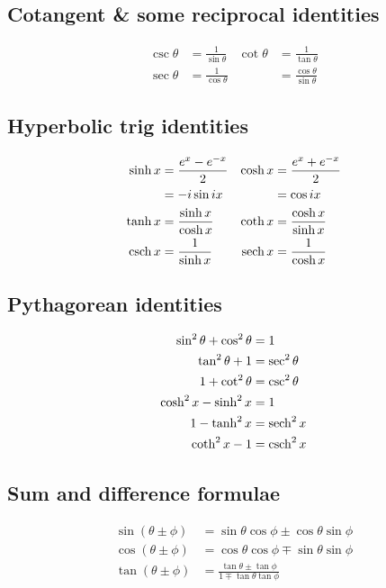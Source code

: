 \documentclass[main.tex]{subfiles}
\begin{document}
	\begin{multicols}{2} \raggedcolumns \setcounter{unbalance}{10}
		\subsection*{Cotangent \& some reciprocal identities}
		\begin{align*}
			\csc\theta &= \frac{1}{\sin\theta} & \cot\theta &= \frac{1}{\tan\theta} \\
			\sec\theta &= \frac{1}{\cos\theta} & &= \frac{\cos\theta}{\sin\theta}
		\end{align*}

		\subsection*{Hyperbolic trig identities}
		\begin{align*}
			\sinh{x} &= \frac{e^x - e^{-x}}{2}		&	\cosh{x} &= \frac{e^x + e^{-x}}{2} \\
			         &= -i \sin{ix}					&	         &= \cos{ix} \\
			\tanh{x} &= \frac{\sinh{x}}{\cosh{x}} 	&	\coth{x} &= \frac{\cosh{x}}{\sinh{x}} \\
			\operatorname{csch}{x} &= \frac{1}{\sinh{x}}			& 	\operatorname{sech}{x} &= \frac{1}{\cosh{x}}
		\end{align*}

		\subsection*{Pythagorean identities}
		\begin{align*}
			\sin^2{\theta} + \cos^2{\theta} &= 1 \\
			\tan^2{\theta} + 1 &= \sec^2{\theta} \\
			1 + \cot^2{\theta} &= \csc^2{\theta} \\
			\cosh^2{x} - \sinh^2{x} &= 1 \\
			1 - \tanh^2{x} &= \operatorname{sech}^2{x} \\
			\coth^2{x} - 1 &= \operatorname{csch}^2{x}
		\end{align*}

		\subsection*{Sum and difference formulae}
		\begin{align*}
			\sin{(\theta \pm \phi)} &= \sin{\theta}\cos{\phi} \pm \cos{\theta}\sin{\phi} \\
			\cos{(\theta \pm \phi)} &= \cos{\theta}\cos{\phi} \mp \sin{\theta}\sin{\phi} \\
			\tan{(\theta \pm \phi)} &= \frac{\tan{\theta} \pm \tan{\phi}}{1 \mp \tan{\theta}\tan{\phi}}
		\end{align*}


\end{multicols}
\end{document}
